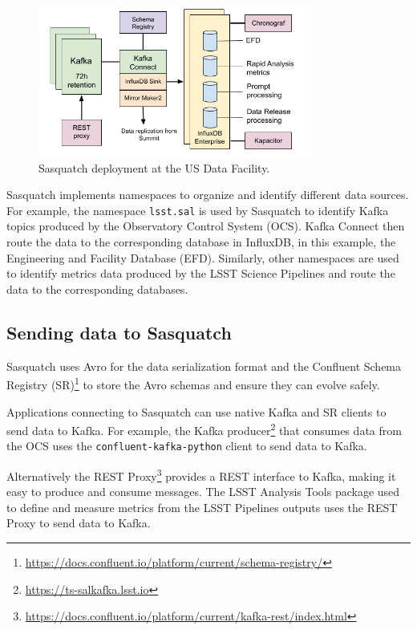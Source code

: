 \begin{figure}[h]
    \centering
    \includegraphics[width=0.8\textwidth]{figures/sasquatch-architecture.png}
    \caption{Sasquatch deployment at the US Data Facility.}
    \label{fig:system-architecture}

\end{figure}

Sasquatch implements namespaces to organize and identify different data sources. For example, the namespace \texttt{lsst.sal} is used by Sasquatch to identify Kafka topics produced by the Observatory Control System (OCS). Kafka Connect then route the data to the corresponding database in InfluxDB, in this example, the Engineering and Facility Database (EFD). Similarly, other namespaces are used to identify metrics data produced by the LSST Science Pipelines and route the data to the corresponding databases.

\subsection{Sending data to Sasquatch}

Sasquatch uses Avro for the data serialization format and the Confluent Schema Registry (SR)\footnote{\url{https://docs.confluent.io/platform/current/schema-registry/}} to store the Avro schemas and ensure they can evolve safely.

Applications connecting to Sasquatch can use native Kafka and SR clients to send data to Kafka. For example, the Kafka producer\footnote{\url{https://ts-salkafka.lsst.io}} that consumes data from the OCS uses the \texttt{confluent-kafka-python} client to send data to Kafka.

Alternatively the REST Proxy\footnote{\url{https://docs.confluent.io/platform/current/kafka-rest/index.html}} provides a REST interface to Kafka, making it easy to produce and consume messages. The LSST Analysis Tools package used to define and measure metrics from the LSST Pipelines outputs uses the REST Proxy to send data to Kafka.

